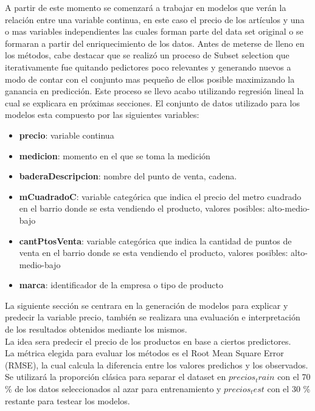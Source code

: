 
A partir de este momento se comenzará a trabajar en modelos que verán la relación entre una variable continua, en este caso el precio de los artículos y una o mas variables independientes las cuales forman parte del data set original o se formaran a partir del enriquecimiento de los datos.
Antes de meterse de lleno en los métodos, cabe destacar que se realizó un proceso de Subset selection que iterativamente fue quitando pedictores poco relevantes y generando nuevos a modo de contar con el conjunto mas pequeño de ellos posible maximizando la ganancia en predicción. Este proceso se llevo acabo utilizando regresión lineal la cual se explicara en próximas secciones.
El conjunto de datos utilizado para los modelos esta compuesto por las siguientes variables:


\begin{itemize}
  \item \textbf{precio}: variable continua
  \item \textbf{medicion}: momento en el que se toma la medición 
  \item \textbf{baderaDescripcion}: nombre del punto de venta, cadena.
  \item \textbf{mCuadradoC}: variable categórica que indica el precio del metro cuadrado en  el barrio donde se esta vendiendo el producto, valores posibles: alto-medio-bajo
  \item \textbf{cantPtosVenta}: variable categórica que indica la cantidad de puntos de venta en el barrio donde se esta vendiendo el producto, valores posibles: alto-medio-bajo 
  \item \textbf{marca}: identificador de la empresa o tipo de producto
\end{itemize}



La siguiente sección se centrara en la generación de modelos para explicar y predecir la variable precio, también se realizara una evaluación e interpretación de los resultados obtenidos mediante los mismos.\\
La idea sera predecir el precio de los productos en base a ciertos predictores.
\cite{Stat_Learning}\\
La métrica elegida para evaluar los métodos es el Root Mean Square Error (RMSE), la cual calcula la diferencia entre los valores predichos y los observados. Se utilizará la proporción clásica para separar el dataset en $precios_train$ con el 70 \% de los datos seleccionados al azar para entrenamiento y $precios_test$ con el 30 \% restante para testear los modelos.



